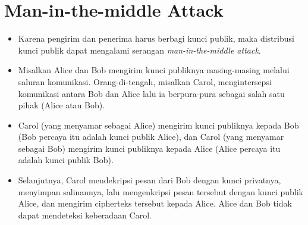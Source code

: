 \documentclass{article}
\begin{document}

\section*{Man-in-the-middle Attack}

\begin{itemize}
    \item Karena pengirim dan penerima harus berbagi kunci publik, maka distribusi kunci publik dapat mengalami serangan \textit{man-in-the-middle attack}.
    \item Misalkan Alice dan Bob mengirim kunci publiknya masing-masing melalui saluran komunikasi. Orang-di-tengah, misalkan Carol, mengintersepsi komunikasi antara Bob dan Alice lalu ia berpura-pura sebagai salah satu pihak (Alice atau Bob).
    \item Carol (yang menyamar sebagai Alice) mengirim kunci publiknya kepada Bob (Bob percaya itu adalah kunci publik Alice), dan Carol (yang menyamar sebagai Bob) mengirim kunci publiknya kepada Alice (Alice percaya itu adalah kunci publik Bob).
    \item Selanjutnya, Carol mendekripsi pesan dari Bob dengan kunci privatnya, menyimpan salinannya, lalu mengenkripsi pesan tersebut dengan kunci publik Alice, dan mengirim cipherteks tersebut kepada Alice. Alice dan Bob tidak dapat mendeteksi keberadaan Carol.
\end{itemize}
\end{document}
